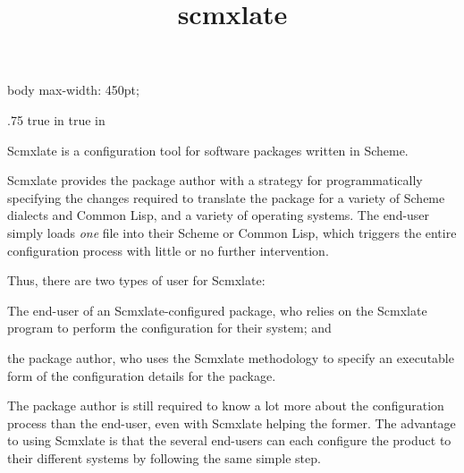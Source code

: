 



\cssblock
body { max-width: 450pt; }
\endcssblock

\let\TZPtexlayout 0
\let\n\noindent
\let\f\numberedfootnote

\ifx\shipout\toHTML
\let\oldsection\section
\def\section{\eject\oldsection}
\fi
\let\re\subsection

\advance\hoffset .75 true in
\advance{} true in

\title{scmxlate}


\centerline{}

\centerline{}

\medskip

Scmxlate is a configuration tool for software
packages written in Scheme.

Scmxlate provides the package author with a strategy
for programmatically specifying the changes required to
translate the package for a variety of Scheme dialects
and Common Lisp, and a variety of operating systems.
The end-user simply loads {\em one} file into
their Scheme or Common Lisp, which triggers the entire
configuration process with little or no further
intervention.

Thus, there are two types of user for Scmxlate:

\item{\bull} The end-user of an Scmxlate-configured package, who
relies on the
Scmxlate program to perform the configuration
for their system; and
\item{\bull} the package author, who uses the Scmxlate
methodology to specify an executable form of the
configuration details for the package.

The package author is still required to know a lot more
about the configuration process than the end-user, even
with Scmxlate helping the former.
The advantage to using Scmxlate is that the several
end-users can each configure the product to their
different systems by following the same simple
step.

